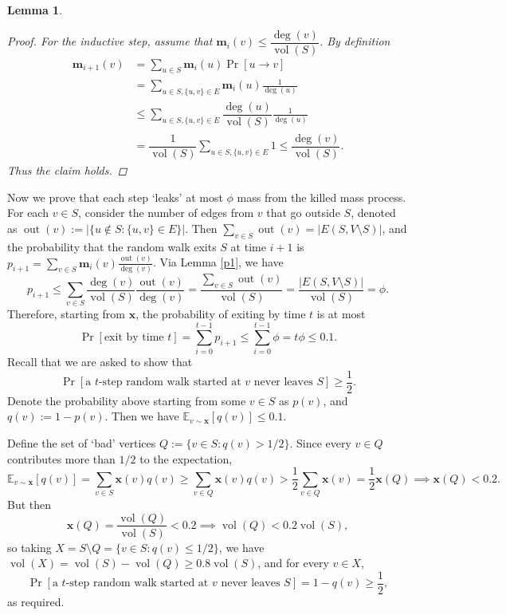 \documentclass[12pt]{article}
\newtheorem{lemma}{Lemma}
\DeclareMathOperator{\vol}{vol}
\DeclareMathOperator{\out}{out}
\newcommand{\x}{\mathbf{x}}
\newcommand{\m}{\mathbf{m}}
\newcommand{\E}{\mathbb{E}}
\begin{document}
\begin{enumerate}[label=\alph*., font=\bfseries]
\begin{lemma}
\begin{proof}
For the inductive step, assume that $\m_i(v)\le\dfrac{\deg(v)}{\vol(S)}$. By definition
\begin{align*}
\m_{i+1}(v)&=\sum_{u\in S}\m_i(u)\Pr[u\to v]\\&=\sum_{u\in S,\{u,v\}\in E}\m_i(u)\frac{1}{\deg(u)}\\&\le\sum_{u\in S,\{u,v\}\in E}\dfrac{\deg(u)}{\vol(S)}\frac{1}{\deg(u)}\\&=\dfrac{1}{\vol(S)}\sum_{u\in S,\{u,v\}\in E}1\le\dfrac{\deg(v)}{\vol(S)}.
\end{align*}
Thus the claim holds.
\end{proof}
\end{lemma}
Now we prove that each step `leaks' at most $\phi$ mass from the killed mass process. For each $v\in S$, consider the number of edges from $v$ that go outside $S$, denoted as $\out(v):=|\{u\notin S:\{u,v\}\in E\}|$. Then $\sum_{v\in S}\out(v)=|E(S,V\setminus S)|$, and the probability that the random walk exits $S$ at time $i+1$ is $\displaystyle p_{i+1}=\sum_{v\in S}\m_i(v)\frac{\out(v)}{\deg(v)}$. Via Lemma \ref{p1}, we have
$$p_{i+1}\le\sum_{v\in S}\dfrac{\deg(v)}{\vol(S)}\frac{\out(v)}{\deg(v)}=\frac{\sum_{v\in S}\out(v)}{\vol(S)}=\frac{|E(S,V\setminus S)|}{\vol(S)}=\phi.$$
Therefore, starting from $\x$, the probability of exiting by time $t$ is at most
$$\Pr[\text{exit by time } t]=\sum_{i=0}^{t-1}p_{i+1}\le\sum_{i=0}^{t-1}\phi=t\phi\le 0.1.$$
Recall that we are asked to show that
$$\Pr[\text{a $t$-step random walk started at $v$ never leaves $S$}]\ge\dfrac{1}{2}.$$
Denote the probability above starting from some $v\in S$ as $p(v)$, and $q(v):=1-p(v)$. Then we have $\E_{v\sim\x}[q(v)]\le 0.1$.

Define the set of `bad' vertices $Q:=\{v\in S:q(v)>1/2\}$. Since every $v\in Q$ contributes more than $1/2$ to the expectation,
$$\E_{v\sim\x}[q(v)]=\sum_{v\in S}\x(v)q(v)\ge\sum_{v\in Q}\x(v)q(v)>\frac 1 2\sum_{v\in Q}\x(v)=\frac{1}{2}\x(Q)\implies\x(Q)<0.2.$$
But then $$\x(Q)=\frac{\vol(Q)}{\vol(S)}<0.2\implies\vol(Q)<0.2\vol(S),$$
so taking $X=S\setminus Q=\{v\in S:q(v)\le 1/2\}$, we have $\vol(X)=\vol(S)-\vol(Q)\ge0.8\vol(S)$, and for every $v\in X$,
$$\Pr[\text{a $t$-step random walk started at $v$ never leaves $S$}]=1-q(v)\ge\frac 1 2,$$as required.
\end{enumerate}
\newpage
\end{document}
